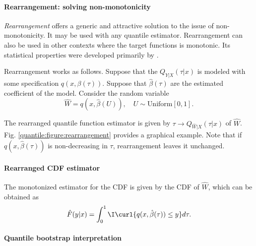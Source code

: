    
 	  
 	  
 	 	 
 	 
 	    	
 	    	\paragraph{Rearrangement: solving non-monotonicity}
 	    	
 	    		 \emph{Rearrangement} offers a generic and attractive solution to the issue of non-monotonicity. It may be used with any quantile estimator. Rearrangement can also be used in other contexts where the target functions is monotonic. 
 	    	Its statistical properties were developed primarily by \cite{Chernozhukov2010QuantileProbabilityCurves}. 
 	    	
 	    	Rearrangement works as follows. Suppose that the $Q_{Y|X}(\tau|x)$ is modeled with some specification $q(x, \beta(\tau))$. Suppose that $\hat{\beta}(\tau)$ are the estimated coefficient of the model.  
 	    	Consider the random variable
 	    	\begin{equation}
 	    		\hat{W} = q(x, \hat{\beta}(U)), \quad U\sim\text{Uniform}[0, 1].
 	    	\end{equation}
     		
     	
 	    	The rearranged quantile function estimator is given by $\tau\to Q_{\hat{W}|X}(\tau|x)$ of $\hat{W}$.  Fig. \eqref{quantile:figure:rearrangement} provides a graphical example.
 	    	Note that if $q(x, \hat{\beta}(\tau))$ is non-decreasing in $\tau$, rearrangement leaves it unchanged.
 	    	
 	    	\paragraph{Rearranged CDF estimator}
 	    	
 	    	The monotonized estimator for the CDF is given by the CDF of $\hat{W}$, which can be obtained as 
 	    	\begin{equation}
 	    		\hat{F}(y|x) = \int_0^1 \I\curl{q(x, \hat{\beta}(\tau))\leq y }d\tau.
 	    	\end{equation}
 	    	
 	    	\paragraph{Quantile bootstrap interpretation}
 	    	
